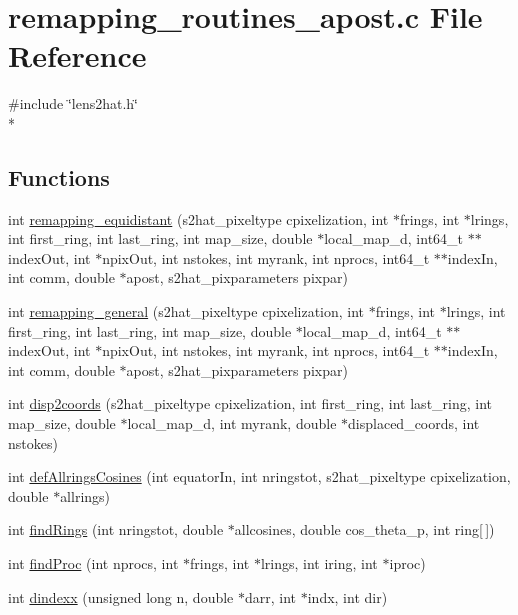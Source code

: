 \section{remapping\-\_\-routines\-\_\-apost.\-c File Reference}
\label{displacement__test__nersc_2remapping__routines__apost_8c}
{\ttfamily \#include \char`\"{}lens2hat.\-h\char`\"{}}\\*
\subsection*{Functions}
\begin{DoxyCompactItemize}
\item 
int \hyperlink{displacement__test__nersc_2remapping__routines__apost_8c_af60485d69bc1372bb232e8565b657ab5}{remapping\-\_\-equidistant} (s2hat\-\_\-pixeltype cpixelization, int $\ast$frings, int $\ast$lrings, int first\-\_\-ring, int last\-\_\-ring, int map\-\_\-size, double $\ast$local\-\_\-map\-\_\-d, int64\-\_\-t $\ast$$\ast$index\-Out, int $\ast$npix\-Out, int nstokes, int myrank, int nprocs, int64\-\_\-t $\ast$$\ast$index\-In, int comm, double $\ast$apost, s2hat\-\_\-pixparameters pixpar)
\item 
int \hyperlink{displacement__test__nersc_2remapping__routines__apost_8c_ae2ea064540d0d53fdb9c99c0ac8b2767}{remapping\-\_\-general} (s2hat\-\_\-pixeltype cpixelization, int $\ast$frings, int $\ast$lrings, int first\-\_\-ring, int last\-\_\-ring, int map\-\_\-size, double $\ast$local\-\_\-map\-\_\-d, int64\-\_\-t $\ast$$\ast$index\-Out, int $\ast$npix\-Out, int nstokes, int myrank, int nprocs, int64\-\_\-t $\ast$$\ast$index\-In, int comm, double $\ast$apost, s2hat\-\_\-pixparameters pixpar)
\item 
int \hyperlink{displacement__test__nersc_2remapping__routines__apost_8c_a8224d455c626532938c1729f5e62daee}{disp2coords} (s2hat\-\_\-pixeltype cpixelization, int first\-\_\-ring, int last\-\_\-ring, int map\-\_\-size, double $\ast$local\-\_\-map\-\_\-d, int myrank, double $\ast$displaced\-\_\-coords, int nstokes)
\item 
int \hyperlink{displacement__test__nersc_2remapping__routines__apost_8c_af6cfda4741a11339b5a1d9c599411b87}{def\-Allrings\-Cosines} (int equator\-In, int nringstot, s2hat\-\_\-pixeltype cpixelization, double $\ast$allrings)
\item 
int \hyperlink{displacement__test__nersc_2remapping__routines__apost_8c_a95c082e86d6e644f4789485021f90235}{find\-Rings} (int nringstot, double $\ast$allcosines, double cos\-\_\-theta\-\_\-p, int ring\mbox{[}$\,$\mbox{]})
\item 
int \hyperlink{displacement__test__nersc_2remapping__routines__apost_8c_af4ba917a5b9f32394911c8d28d6c2d07}{find\-Proc} (int nprocs, int $\ast$frings, int $\ast$lrings, int iring, int $\ast$iproc)
\item 
int \hyperlink{displacement__test__nersc_2remapping__routines__apost_8c_ad574f0dfca1f8db2b630a9b6cf3a45c9}{dindexx} (unsigned long n, double $\ast$darr, int $\ast$indx, int dir)
\end{DoxyCompactItemize}


